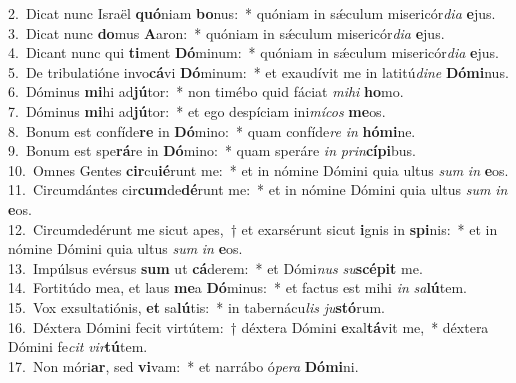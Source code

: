 {2.~}Dicat nunc Israël \textbf{quó}niam \textbf{bo}nus:~* quóniam in sǽculum misericór\textit{di}\textit{a} \textbf{e}jus.\\
{3.~}Dicat nunc \textbf{do}mus \textbf{A}aron:~* quóniam in sǽculum misericór\textit{di}\textit{a} \textbf{e}jus.\\
{4.~}Dicant nunc qui \textbf{ti}ment \textbf{Dó}minum:~* quóniam in sǽculum misericór\textit{di}\textit{a} \textbf{e}jus.\\
{5.~}De tribulatióne invo\textbf{cá}vi \textbf{Dó}minum:~* et exaudívit me in latitú\textit{di}\textit{ne} \textbf{Dó}\textbf{mi}nus.\\
{6.~}Dóminus \textbf{mi}hi ad\textbf{jú}tor:~* non timébo quid fáciat \textit{mi}\textit{hi} \textbf{ho}mo.\\
{7.~}Dóminus \textbf{mi}hi ad\textbf{jú}tor:~* et ego despíciam ini\textit{mí}\textit{cos} \textbf{me}os.\\
{8.~}Bonum est confíde\textbf{re} in \textbf{Dó}mino:~* quam confíde\textit{re} \textit{in} \textbf{hó}\textbf{mi}ne.\\
{9.~}Bonum est spe\textbf{rá}re in \textbf{Dó}mino:~* quam speráre \textit{in} \textit{prin}\textbf{cí}\textbf{pi}bus.\\
{10.~}Omnes Gentes \textbf{cir}cu\textbf{ié}runt me:~* et in nómine Dómini quia ultus \textit{sum} \textit{in} \textbf{e}os.\\
{11.~}Circumdántes cir\textbf{cum}de\textbf{dé}runt me:~* et in nómine Dómini quia ultus \textit{sum} \textit{in} \textbf{e}os.\\
{12.~}Circumdedérunt me sicut apes,~† et exarsérunt sicut \textbf{i}gnis in \textbf{spi}nis:~* et in nómine Dómini quia ultus \textit{sum} \textit{in} \textbf{e}os.\\
{13.~}Impúlsus evérsus \textbf{sum} ut \textbf{cá}derem:~* et Dómi\textit{nus} \textit{su}\textbf{scé}\textbf{pit} me.\\
{14.~}Fortitúdo mea, et laus \textbf{me}a \textbf{Dó}minus:~* et factus est mihi \textit{in} \textit{sa}\textbf{lú}tem.\\
{15.~}Vox exsultatiónis, \textbf{et} sa\textbf{lú}tis:~* in tabernácu\textit{lis} \textit{ju}\textbf{stó}rum.\\
{16.~}Déxtera Dómini fecit virtútem:~† déxtera Dómini \textbf{e}xal\textbf{tá}vit me,~* déxtera Dómini fe\textit{cit} \textit{vir}\textbf{tú}tem.\\
{17.~}Non móri\textbf{ar}, sed \textbf{vi}vam:~* et narrábo ó\textit{pe}\textit{ra} \textbf{Dó}\textbf{mi}ni.\\
